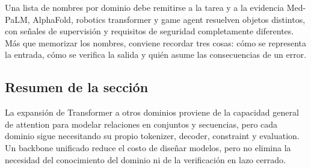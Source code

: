 

\begin{warningbox}{Una lista de nombres por dominio debe remitirse a la tarea y a la evidencia}
Med-PaLM, AlphaFold, robotics transformer y game agent resuelven objetos distintos, con señales de supervisión y requisitos de seguridad completamente diferentes. Más que memorizar los nombres, conviene recordar tres cosas: cómo se representa la entrada, cómo se verifica la salida y quién asume las consecuencias de un error.
\end{warningbox}

\subsection{Resumen de la sección}

La expansión de Transformer a otros dominios proviene de la capacidad general de attention para modelar relaciones en conjuntos y secuencias, pero cada dominio sigue necesitando su propio tokenizer, decoder, constraint y evaluation. Un backbone unificado reduce el costo de diseñar modelos, pero no elimina la necesidad del conocimiento del dominio ni de la verificación en lazo cerrado.
